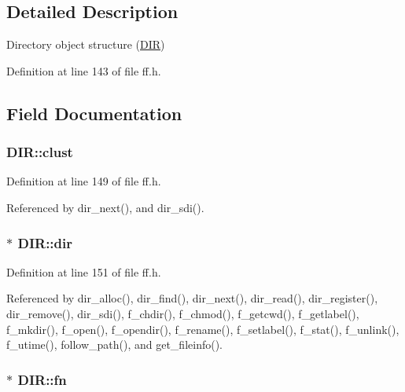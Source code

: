 \subsection{Detailed Description}
Directory object structure (\hyperlink{structDIR}{D\+IR}) 

Definition at line 143 of file ff.\+h.



\subsection{Field Documentation}
\subsubsection[{\texorpdfstring{clust}{clust}}]{ D\+I\+R\+::clust}\hypertarget{structDIR_acfbb8ba2d6e73b6f999ceffd1857c190}{}\label{structDIR_acfbb8ba2d6e73b6f999ceffd1857c190}


Definition at line 149 of file ff.\+h.



Referenced by dir\+\_\+next(), and dir\+\_\+sdi().

\subsubsection[{\texorpdfstring{dir}{dir}}]{$\ast$ D\+I\+R\+::dir}\hypertarget{structDIR_a6c2a8c0cf2d55ae99775e93a16593449}{}\label{structDIR_a6c2a8c0cf2d55ae99775e93a16593449}


Definition at line 151 of file ff.\+h.



Referenced by dir\+\_\+alloc(), dir\+\_\+find(), dir\+\_\+next(), dir\+\_\+read(), dir\+\_\+register(), dir\+\_\+remove(), dir\+\_\+sdi(), f\+\_\+chdir(), f\+\_\+chmod(), f\+\_\+getcwd(), f\+\_\+getlabel(), f\+\_\+mkdir(), f\+\_\+open(), f\+\_\+opendir(), f\+\_\+rename(), f\+\_\+setlabel(), f\+\_\+stat(), f\+\_\+unlink(), f\+\_\+utime(), follow\+\_\+path(), and get\+\_\+fileinfo().

\subsubsection[{\texorpdfstring{fn}{fn}}]{$\ast$ D\+I\+R\+::fn}\hypertarget{structDIR_a32da2f31d6c3b6c42eef981cb0cfd2ee}{}\label{structDIR_a32da2f31d6c3b6c42eef981cb0cfd2ee}


